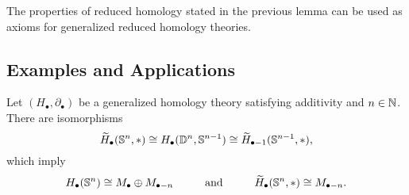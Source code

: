 	\begin{remark}
		The properties of reduced homology stated in the previous lemma can be used as axioms for generalized reduced homology theories.
	\end{remark}

	\newpage
	\subsection{Examples and Applications}

	\begin{lemma}
		Let $(H_\bullet, \partial_\bullet)$ be a generalized homology theory satisfying additivity and $n \in \mathbb{N}$. There are isomorphisms
		\begin{equation*}
			\widetilde{H}_\bullet(\mathbb{S}^n,*) \cong H_\bullet(\mathbb{D}^n,\mathbb{S}^{n-1}) \cong \widetilde{H}_{\bullet-1}(\mathbb{S}^{n-1},*),
		\end{equation*}
		which imply
		\begin{equation*}
			H_\bullet(\mathbb{S}^n) \cong M_\bullet \oplus M_{\bullet-n} \hspace{1cm}\text{and}\hspace{1cm} \widetilde{H}_\bullet(\mathbb{S}^n,*) \cong M_{\bullet-n}.
		\end{equation*}
	\end{lemma}

